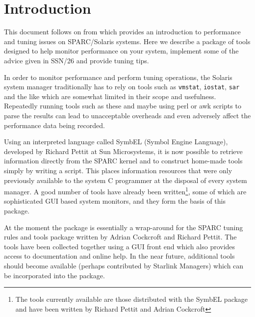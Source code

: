 \begin{latexonly}
   \setlength{\parskip}{0mm}
   \latexonlytoc
   \setlength{\parskip}{\medskipamount}
   \markright{\stardocname}
\end{latexonly}

\newpage
\section{Introduction}

This document follows on from  which provides an
introduction to performance and tuning issues on SPARC/Solaris systems. 
Here we describe a package of tools designed to help monitor performance 
on your system, implement some of the advice given in SSN/26 and provide 
tuning tips.

In order to monitor performance and perform tuning operations, the Solaris
system manager traditionally has to rely on tools such as {\tt{vmstat}}, 
{\tt{iostat}}, {\tt{sar}} and the like which are somewhat limited in their
scope and usefulness. Repeatedly running tools such as these and maybe
using perl or awk scripts to parse the results can lead to unacceptable
overheads and even adversely affect the performance data being recorded.

Using an interpreted language called SymbEL (Symbol Engine Language),
developed by Richard Pettit at Sun Microsystems, it is now possible to 
retrieve information directly from the SPARC kernel and to construct
home-made tools simply by writing a script. This places information 
resources that were only previously available to the system C programmer 
at the disposal of every system manager. A good number of tools have already
been written\footnote{The tools currently available are those distributed
with the SymbEL package and have been written by Richard Pettit and Adrian
Cockcroft}, some of which are sophisticated GUI based system monitors, and
they form the basis of this package.

At the moment the package is essentially a wrap-around for the SPARC tuning
rules and tools package written by Adrian Cockcroft and Richard Pettit. The
tools have been collected together using a GUI front end which also provides
access to documentation and online help. In the near future, additional tools
should become available (perhaps contributed by Starlink Managers) which
can be incorporated into the package.

